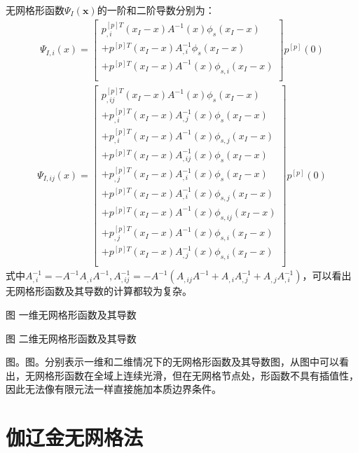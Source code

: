 \documentclass[a4paper]{ctexbook}
\begin{document}
无网格形函数$\Psi_I(\pmb{x})$的一阶和二阶导数分别为：
\begin{equation}
\begin{split}
    \Psi_{I,i}(x)=\left[\begin{matrix}
    p_{,i}^{[p]T}(x_I-x)A^{-1}(x)\phi_s(x_I-x)\\
    +p^{[p]T}(x_I-x)A_{,i}^{-1}\phi_s(x_I-x)\\
    +p^{[p]T}(x_I-x)A^{-1}(x)\phi _{s,i}(x_I-x)\\
    \end{matrix}\right]
    p^{[p]}(0)
\end{split}
\end{equation}
\begin{equation}
\begin{split}
    \Psi_{I,ij}(x)=\left[\begin{matrix}
    p_{,ij}^{[p]T}(x_I-x)A^{-1}(x)\phi_s(x_I-x)\\
    +p_{,i}^{[p]T}(x_I-x)A_{,j}^{-1}(x)\phi_s(x_I-x)\\
    +p_{,i}^{[p]T}(x_I-x)A^{-1}(x)\phi_{s,j}(x_I-x)\\
    +p^{[p]T}(x_I-x)A_{,ij}^{-1}(x)\phi_s(x_I-x)\\
    +p_{,j}^{[p]T}(x_I-x)A_{,i}^{-1}(x)\phi_s(x_I-x)\\
    +p^{[p]T}(x_I-x)A_{,i}^{-1}(x)\phi_{s,j}(x_I-x)\\
    +p^{[p]T}(x_I-x)A^{-1}(x)\phi_{s,ij}(x_I-x)\\
    +p_{,j}^{[p]T}(x_I-x)A^{-1}(x)\phi_{s,i}(x_I-x)\\
    +p^{[p]T}(x_I-x)A_{,j}^{-1}(x)\phi_{s,i}(x_I-x)\\
    \end{matrix}\right]
    p^{[p]}(0)
\end{split}
\end{equation}
式中$A_{,i}^{-1}=-A^{-1}A_{,i}A^{-1},A_{,ij}^{-1}=-A^{-1}(A_{,ij}A^{-1}+A_{,i}A_{,j}^{-1}+A_{,j}A_{,i}^{-1})$，可以看出无网格形函数及其导数的计算都较为复杂。\par
图 一维无网格形函数及其导数\\\par
图 二维无网格形函数及其导数\par
图。图。分别表示一维和二维情况下的无网格形函数及其导数图，从图中可以看出，无网格形函数在全域上连续光滑，但在无网格节点处，形函数不具有插值性，因此无法像有限元法一样直接施加本质边界条件。

\chapter{伽辽金无网格法}
\end{document}
